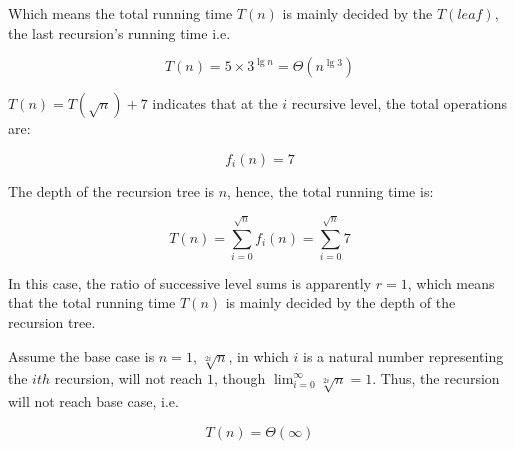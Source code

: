 \begin{homeworkProblem}
\begin{homeworkSubProblem}[\texorpdfstring{$T(n)=3T(n/2)+5n$}{T(n)=3T(n/2)+5n}]
Which means the total running time $T(n)$ is mainly decided by the $T(leaf)$, the last recursion's running time i.e.

\begin{equation}
T(n) = 5 \times 3^{\lg n}= \Theta(n^{\lg3})
\end{equation}

\end{homeworkSubProblem}

\begin{homeworkSubProblem}[\texorpdfstring{$T(n)=T(\sqrt{n})+7$}{T(n)=T(sqrt(n))+7}]

$T(n)=T(\sqrt{n})+7$ indicates that at the $i$ recursive level, the total operations are:

\begin{equation}
f_i(n) = 7
\end{equation}

The depth of the recursion tree is $n$, hence, the total running time is:

\begin{equation}
T(n) =\sum_{i=0}^{\sqrt{n}} f_i(n) = \sum_{i=0}^{\sqrt{n}} 7
\end{equation}

In this case, the ratio of successive level sums is apparently $r = 1$, which means that the total running time $T(n)$ is mainly decided by the depth of the recursion tree.

Assume the base case is $n=1$, $\sqrt[2i]{n}$, in which $i$ is a natural number representing the $ith$ recursion, will not reach $1$, though $\lim_{i=0}^{\infty} \sqrt[2i]{n}= 1$. Thus, the recursion will not reach base case, i.e.

\begin{equation} \label{eq:6.6}
T(n) = \Theta(\infty)
\end{equation}

\end{homeworkSubProblem}

\end{homeworkProblem}
